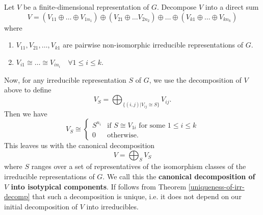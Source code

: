 \begin{defn}
Let $V$ be a finite-dimensional representation of $G$. Decompose $V$ into a direct sum
\[ V = (V_{11} \oplus \ldots \oplus V_{1 n_1}) \oplus (V_{21} \oplus \ldots V_{2 n_2}) \oplus \ldots \oplus (V_{k 1} \oplus \ldots \oplus V_{k n_k}) \] 
where 
\begin{enumerate}
\item $V_{11}, V_{21}, \ldots, V_{k1}$ are pairwise non-isomorphic irreducible representations of $G$.
\item $V_{i 1} \cong \ldots \cong V_{i n_i} \quad \forall 1 \leq i \leq k.$
\end{enumerate}
Now, for any irreducible representation $S$ of $G$, we use the decomposition of $V$ above to define
\[ V_S = \bigoplus_{ \{(i,j) | V_{ij} \cong S\}} V_{ij}.\] 
Then we have
\[ V_S \cong  \begin{cases} S^{n_i} &\text{if } S \cong V_{1i} \text{ for some } 1 \leq i \leq k \\ 0 &\text{otherwise}. \end{cases} \]
This leaves us with the canonical decomposition
\[ V = \bigoplus_{S} V_S \]
where $S$ ranges over a set of representatives of the isomorphism classes of the irreducible representations of $G$.  We call this the \textbf{canonical decomposition of $V$ into isotypical components}. If follows from Theorem \ref{uniqueness-of-irr-decomp} that such a decomposition is unique, i.e. it does not depend on our initial decomposition of $V$ into irreducibles.
\end{defn}

